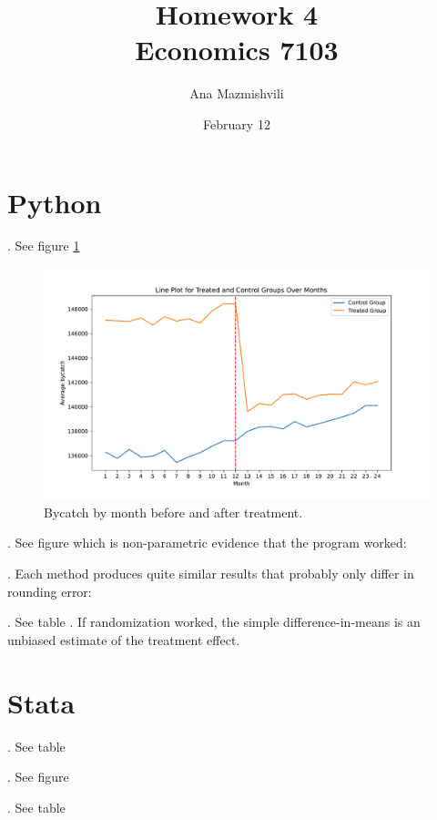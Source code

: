 \documentclass{article}
\title{Homework 4 \\ Economics 7103}
\author{Ana Mazmishvili}
\date{February 12}
\begin{document}
  
\maketitle

\section{Python}

. See figure \ref{fig:trend}

\begin{figure}[h]
    \centering
    \includegraphics{homework 4/output/figure/trend1.pdf}
    \caption{ Bycatch by month before and after treatment. }
    \label{fig:trend}
\end{figure}



. See figure  which is non-parametric evidence that the program worked:


. Each method produces quite similar results that probably only differ in rounding error:

. See table .  If randomization worked, the simple difference-in-means is an unbiased estimate of the treatment effect.
\section{Stata}

. See table 



. See figure 



. See table 
\end{document}
